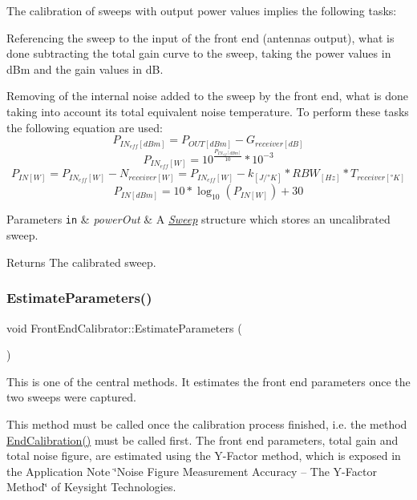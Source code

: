 The calibration of sweeps with output power values implies the following tasks\+:
\begin{DoxyItemize}
\item Referencing the sweep to the input of the front end (antenna\textquotesingle{}s output), what is done subtracting the total gain curve to the sweep, taking the power values in d\+Bm and the gain values in dB.
\item Removing of the internal noise added to the sweep by the front end, what is done taking into account its total equivalent noise temperature. To perform these tasks the following equation are used\+: \[ P_{IN_{eff}[dBm]}=P_{OUT[dBm]}-G_{receiver[dB]} \] \[ P_{IN_{eff}[W]}=10^{\frac{P_{IN_{eff}[dBm]}}{10}}*10^{-3} \] \[ P_{IN[W]}=P_{IN_{eff}[W]}-N_{receiver[W]}=P_{IN_{eff}[W]}-k_{[J/°K]}*RBW_{[Hz]}*T_{receiver[°K]} \] \[ P_{IN[dBm]}=10*\log_{10}(P_{IN[W]})+30 \] 
\begin{DoxyParams}[1]{Parameters}
\mbox{\tt in}  & {\em power\+Out} & A {\itshape \hyperlink{structSweep}{Sweep}} structure which stores an uncalibrated sweep. \\
\hline
\end{DoxyParams}
\begin{DoxyReturn}{Returns}
The calibrated sweep. 
\end{DoxyReturn}

\end{DoxyItemize}\mbox{\label{classFrontEndCalibrator_a2d643afa2c6bcf15b0f051cdc34855c2}} 
\subsubsection{\texorpdfstring{Estimate\+Parameters()}{EstimateParameters()}}
{\footnotesize\ttfamily void Front\+End\+Calibrator\+::\+Estimate\+Parameters (\begin{DoxyParamCaption}{ }\end{DoxyParamCaption})}



This is one of the central methods. It estimates the front end parameters once the two sweeps were captured. 

This method must be called once the calibration process finished, i.\+e. the method {\ttfamily \hyperlink{classFrontEndCalibrator_a4ba6971b00b7736b80e04a5f9ca784dc}{End\+Calibration()}} must be called first. The front end parameters, total gain and total noise figure, are estimated using the Y-\/\+Factor method, which is exposed in the Application Note \char`\"{}\+Noise Figure Measurement Accuracy – The Y-\/\+Factor Method\char`\"{} of Keysight Technologies.

